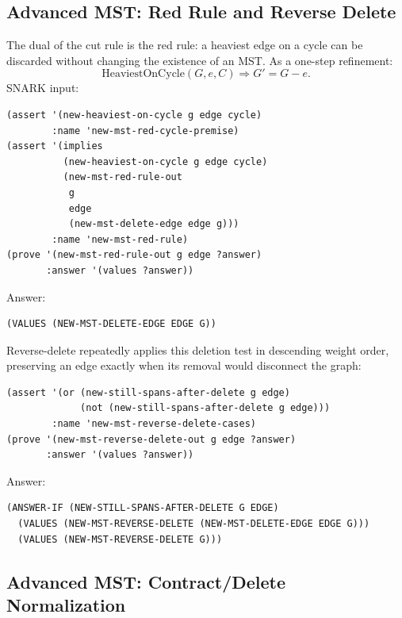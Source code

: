 \documentclass[runningheads]{llncs}
\begin{document}
\subsection{Advanced MST: Red Rule and Reverse Delete}

The dual of the cut rule is the red rule: a heaviest edge on a cycle can be
discarded without changing the existence of an MST.  As a one-step refinement:
\[
  \mathrm{HeaviestOnCycle}(G,e,C)\Rightarrow G'=G-e.
\]
SNARK input:
\begin{lstlisting}
(assert '(new-heaviest-on-cycle g edge cycle)
        :name 'new-mst-red-cycle-premise)
(assert '(implies
          (new-heaviest-on-cycle g edge cycle)
          (new-mst-red-rule-out
           g
           edge
           (new-mst-delete-edge edge g)))
        :name 'new-mst-red-rule)
(prove '(new-mst-red-rule-out g edge ?answer)
       :answer '(values ?answer))
\end{lstlisting}
Answer:
\begin{lstlisting}
(VALUES (NEW-MST-DELETE-EDGE EDGE G))
\end{lstlisting}

Reverse-delete repeatedly applies this deletion test in descending weight
order, preserving an edge exactly when its removal would disconnect the graph:
\begin{lstlisting}
(assert '(or (new-still-spans-after-delete g edge)
             (not (new-still-spans-after-delete g edge)))
        :name 'new-mst-reverse-delete-cases)
(prove '(new-mst-reverse-delete-out g edge ?answer)
       :answer '(values ?answer))
\end{lstlisting}
Answer:
\begin{lstlisting}
(ANSWER-IF (NEW-STILL-SPANS-AFTER-DELETE G EDGE)
  (VALUES (NEW-MST-REVERSE-DELETE (NEW-MST-DELETE-EDGE EDGE G)))
  (VALUES (NEW-MST-REVERSE-DELETE G)))
\end{lstlisting}

\subsection{Advanced MST: Contract/Delete Normalization}
\end{document}

